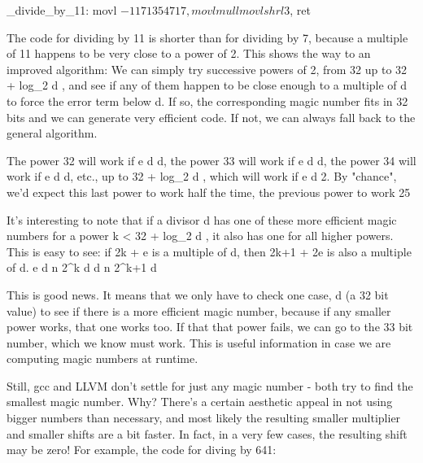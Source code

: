 _divide_by_11:
  movl  $-1171354717, %
  movl  %
  mull  %
  movl  %
  shrl  $3, %
  ret

The code for dividing by 11 is shorter than for dividing by 7, because a multiple of 11 happens to be very close to a power of 2. This shows the way to an improved algorithm: We can simply try successive powers of 2, from 32 up to 32 + \lfloor log_2 d \rfloor, and see if any of them happen to be close enough to a multiple of d to force the error term below  d. If so, the corresponding magic number fits in 32 bits and we can generate very efficient code. If not, we can always fall back to the general algorithm.

The power 32 will work if \frac e d \leq {} d, the power 33 will work if \frac e d \leq {} d, the power 34 will work if \frac e d \leq {} d, etc., up to 32 + \lfloor log_2 d \rfloor, which will work if \frac e d \leq {} 2. By "chance", we'd expect this last power to work half the time, the previous power to work 25%

It's interesting to note that if a divisor d has one of these more efficient magic numbers for a power k < 32 + \lceil log_2 d \rceil, it also has one for all higher powers. This is easy to see: if 2k + e is a multiple of d, then 2k+1 + 2e is also a multiple of d.
\frac e d \times \frac n {2^k} \leq {} d \implies {} d \times \frac n {2^{k+1}} \leq {} d

This is good news. It means that we only have to check one case, \lceil {} d \rceil (a 32 bit value) to see if there is a more efficient magic number, because if any smaller power works, that one works too. If that that power fails, we can go to the 33 bit number, which we know must work. This is useful information in case we are computing magic numbers at runtime.

Still, gcc and LLVM don't settle for just any magic number - both try to find the smallest magic number. Why? There's a certain aesthetic appeal in not using bigger numbers than necessary, and most likely the resulting smaller multiplier and smaller shifts are a bit faster. In fact, in a very few cases, the resulting shift may be zero! For example, the code for diving by 641:


